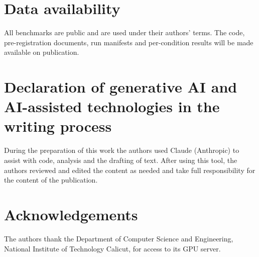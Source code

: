 \documentclass[a4paper,fleqn]{cas-sc}
\begin{document}
\section*{Data availability}
All benchmarks are public and are used under their authors' terms. The code,
pre-registration documents, run manifests and per-condition results will be made
available on publication.

\section*{Declaration of generative AI and AI-assisted technologies in the writing process}
During the preparation of this work the authors used Claude (Anthropic) to assist
with code, analysis and the drafting of text. After using this tool, the authors
reviewed and edited the content as needed and take full responsibility for the
content of the publication.

\section*{Acknowledgements}
The authors thank the Department of Computer Science and Engineering, National
Institute of Technology Calicut, for access to its GPU server.

\printcredits



\end{document}
